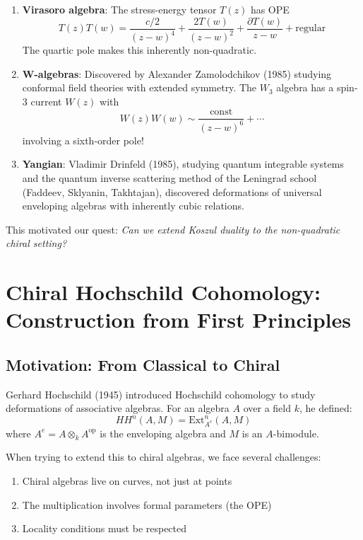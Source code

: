 \begin{example}
\begin{enumerate}
\item \textbf{Virasoro algebra}: The stress-energy tensor $T(z)$ has OPE
\[
T(z)T(w) = \frac{c/2}{(z-w)^4} + \frac{2T(w)}{(z-w)^2} + \frac{\partial T(w)}{z-w} + \text{regular}
\]
The quartic pole makes this inherently non-quadratic.

\item \textbf{W-algebras}: Discovered by Alexander Zamolodchikov (1985) studying conformal field theories with extended symmetry. The $W_3$ algebra has a spin-3 current $W(z)$ with
\[
W(z)W(w) \sim \frac{\text{const}}{(z-w)^6} + \cdots
\]
involving a sixth-order pole!

\item \textbf{Yangian}: Vladimir Drinfeld (1985), studying quantum integrable systems and the quantum inverse scattering method of the Leningrad school (Faddeev, Sklyanin, Takhtajan), discovered deformations of universal enveloping algebras with inherently cubic relations.
\end{enumerate}
\end{example}

This motivated our quest: \emph{Can we extend Koszul duality to the non-quadratic chiral setting?}


\section{Chiral Hochschild Cohomology: Construction from First Principles}

\subsection{Motivation: From Classical to Chiral}

Gerhard Hochschild (1945) introduced Hochschild cohomology to study deformations of associative algebras. For an algebra $A$ over a field $k$, he defined:
\[
HH^n(A, M) = \text{Ext}^n_{A^e}(A, M)
\]
where $A^e = A \otimes_k A^{\text{op}}$ is the enveloping algebra and $M$ is an $A$-bimodule.

When trying to extend this to chiral algebras, we face several challenges:
\begin{enumerate}
\item Chiral algebras live on curves, not just at points
\item The multiplication involves formal parameters (the OPE)
\item Locality conditions must be respected
\end{enumerate}

